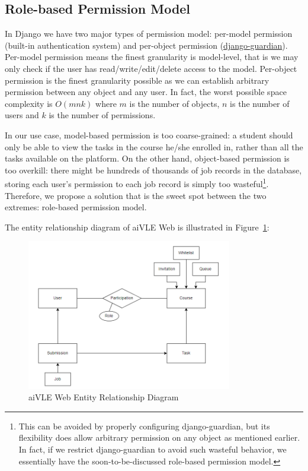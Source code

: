 \subsection{Role-based Permission Model}
\label{ss:aivle-web-permission-model}
In Django we have two major types of permission model: per-model permission (built-in authentication system) and per-object permission (\href{https://github.com/django-guardian/django-guardian}{django-guardian}). Per-model permission means the finest granularity is model-level, that is we may only check if the user has read/write/edit/delete access to the model. Per-object permission is the finest granularity possible as we can establish arbitrary permission between any object and any user. In fact, the worst possible space complexity is $O(mnk)$ where $m$ is the number of objects, $n$ is the number of users and $k$ is the number of permissions.

In our use case, model-based permission is too coarse-grained: a student should only be able to view the tasks in the course he/she enrolled in, rather than all the tasks available on the platform. On the other hand, object-based permission is too overkill: there might be hundreds of thousands of job records in the database, storing each user's permission to each job record is simply too wasteful\footnote{This can be avoided by properly configuring django-guardian, but its flexibility does allow arbitrary permission on any object as mentioned earlier. In fact, if we restrict django-guardian to avoid such wasteful behavior, we essentially have the soon-to-be-discussed role-based permission model.}. Therefore, we propose a solution that is the sweet spot between the two extremes: role-based permission model.

The entity relationship diagram of aiVLE Web is illustrated in Figure~\ref{fig:aivle-web-er-diagram}:
\begin{figure}[H]
    \centering
    \includegraphics[width=0.8\textwidth]{images/aivle-web-er-diagram.png}
    \caption{aiVLE Web Entity Relationship Diagram}
    \label{fig:aivle-web-er-diagram}
\end{figure}

